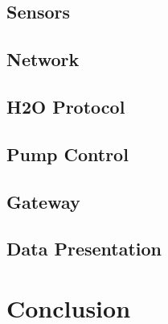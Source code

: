 \documentclass[11pt,paper=a4,parskip=half]{scrartcl}
\begin{document}
\subsection{Sensors}



\subsection{Network}



\subsection{H2O Protocol}



\subsection{Pump Control}



\subsection{Gateway}



\subsection{Data Presentation}



\section{Conclusion}





\end{document}
